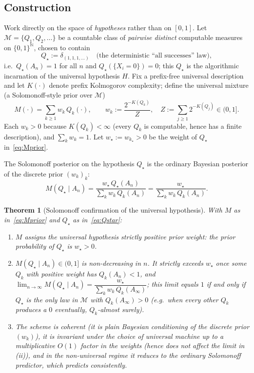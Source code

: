 \documentclass{amsart}
\newtheorem{theorem}{Theorem}
\theoremstyle{definition}
\newcommand{\N}{\mathbb{N}}
\begin{document}
\subsection{Construction}
Work directly on the space of \emph{hypotheses} rather than on $[0,1]$. Let
$\mathcal M=\{Q_1,Q_2,\dots\}$ be a countable class of \emph{pairwise distinct}
computable measures on
$\{0,1\}^\N$, chosen to contain
\begin{equation}\label{eq:Qstar}
  Q_\star:=\delta_{(1,1,1,\dots)}\quad\text{(the deterministic ``all successes'' law)},
\end{equation}
i.e.\ $Q_\star(A_n)=1$ for all $n$ and $Q_\star(\{X_i=0\})=0$; this $Q_\star$ is
the algorithmic incarnation of the universal hypothesis $H$. Fix a prefix-free
universal description and let $K(\cdot)$ denote prefix Kolmogorov complexity;
define the universal mixture (a Solomonoff-style prior over $\mathcal M$)
\begin{equation}\label{eq:Mprior}
  M(\cdot)=\sum_{k\ge1} w_k\,Q_k(\cdot),\qquad
  w_k:=\frac{2^{-K(Q_k)}}{Z},\quad
  Z:=\sum_{j\ge1}2^{-K(Q_j)}\in(0,1] .
\end{equation}
Each $w_k>0$ because $K(Q_k)<\infty$ (every $Q_k$ is computable, hence has a
finite description), and $\sum_k w_k=1$. Let $w_\star:=w_{k_\star}>0$ be the
weight of $Q_\star$ in~\eqref{eq:Mprior}.

The Solomonoff posterior on the hypothesis $Q_\star$ is the ordinary Bayesian
posterior of the discrete prior $(w_k)_k$:
\begin{equation}\label{eq:solpost}
  M(Q_\star\mid A_n)=\frac{w_\star\,Q_\star(A_n)}{\sum_k w_k\,Q_k(A_n)}
  =\frac{w_\star}{\sum_k w_k\,Q_k(A_n)} .
\end{equation}

\begin{theorem}[Solomonoff confirmation of the universal hypothesis]\label{thm:sol}
With $M$ as in~\eqref{eq:Mprior} and $Q_\star$ as in~\eqref{eq:Qstar}:
\begin{enumerate}
\item[\textup{(i)}] $M$ assigns the universal hypothesis strictly positive prior
weight: the prior probability of $Q_\star$ is $w_\star>0$.
\item[\textup{(ii)}] $M(Q_\star\mid A_n)\in(0,1]$ is non-decreasing in $n$. It
strictly exceeds $w_\star$ once some $Q_k$ with positive weight has $Q_k(A_n)<1$,
and
$\lim_{n\to\infty}M(Q_\star\mid A_n)
=\dfrac{w_\star}{\sum_k w_k\,Q_k(A_\infty)}$;
this limit equals $1$ if and only if $Q_\star$ is the only law in $\mathcal M$
with $Q_k(A_\infty)>0$ (e.g.\ when every other $Q_k$ produces a $0$ eventually,
$Q_k$-almost surely).
\item[\textup{(iii)}] The scheme is coherent (it is plain Bayesian conditioning
of the discrete prior $(w_k)$), it is invariant under the choice of universal
machine up to a multiplicative $O(1)$ factor in the weights (hence does not
affect the limit in (ii)), and in the non-universal regime it reduces to the
ordinary Solomonoff predictor, which predicts consistently.
\end{enumerate}
\end{theorem}
\end{document}
